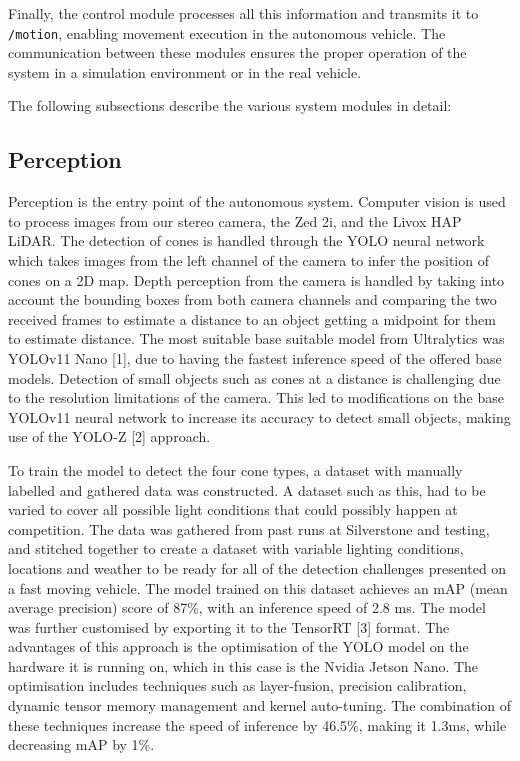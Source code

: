 \documentclass[a4paper,11pt]{report}
\begin{document}
Finally, the control module processes all this information and transmits it to \texttt{/motion}, enabling movement execution in the autonomous vehicle. The communication between these modules ensures the proper operation of the system in a simulation environment or in the real vehicle.

The following subsections describe the various system modules in detail:

\subsection{Perception}

Perception is the entry point of the autonomous system. Computer vision is used to process images from our stereo camera, the Zed 2i, and the Livox HAP LiDAR. The detection of cones is handled through the YOLO neural network which takes images from the left channel of the camera to infer the position of cones on a 2D map. Depth perception from the camera is handled by taking into account the bounding boxes from both camera channels and comparing the two received frames to estimate a distance to an object getting a midpoint for them to estimate distance. The most suitable base suitable model from Ultralytics was YOLOv11 Nano [1], due to having the fastest inference speed of the offered base models. Detection of small objects such as cones at a distance is challenging due to the resolution limitations of the camera. This led to modifications on the base YOLOv11 neural network to increase its accuracy to detect small objects, making use of the YOLO-Z [2] approach.

To train the model to detect the four cone types, a dataset with manually labelled and gathered data was constructed. A dataset such as this, had to be varied to cover all possible light conditions that could possibly happen at competition. The data was gathered from past runs at Silverstone and testing, and stitched together to create a dataset with variable lighting conditions, locations and weather to be ready for all of the detection challenges presented on a fast moving vehicle. The model trained on this dataset achieves an mAP (mean average precision) score of 87\%, with an inference speed of 2.8 ms. The model was further customised by exporting it to the TensorRT [3] format. The advantages of this approach is the optimisation of the YOLO model on the hardware it is running on, which in this case is the Nvidia Jetson Nano. The optimisation includes techniques such as layer-fusion, precision calibration, dynamic tensor memory management and kernel auto-tuning. The combination of these techniques increase the speed of inference by 46.5\%, making it 1.3ms, while decreasing mAP by 1\%.  
\end{document}
